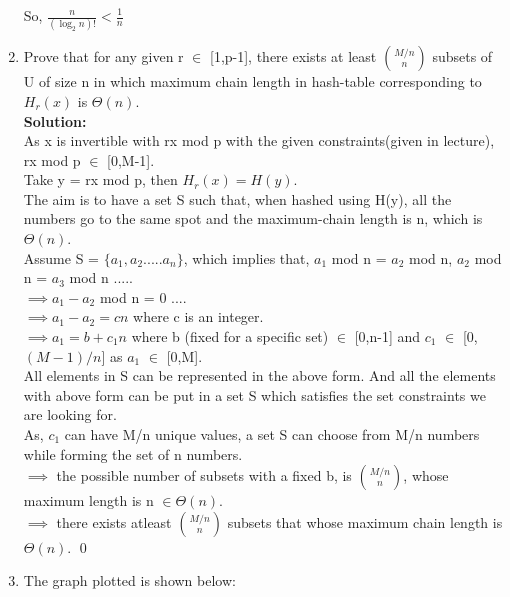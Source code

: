 \documentclass[a4paper]{article}
\begin{document}
\begin{enumerate}[label=(\alph*)]
\begin{center}
    So, $\frac{n}{(\log_2 n)!} < \frac{1}{n}$
\end{center}
\item Prove that for any given r $\in$ [1,p-1], there exists at least $M/n \choose n$ subsets of U of size n in which maximum chain length in hash-table corresponding to $H_r(x)$ is $\Theta(n)$.\\
\textbf{Solution:}\\
As x is invertible with rx mod p with the given constraints(given in lecture), rx mod p $\in$ [0,M-1].\\
Take y = rx mod p, then $H_r(x) = H(y)$. \\
The aim is to have a set S such that, when hashed using H(y), all the numbers go to the same spot and the maximum-chain length is n, which is $\Theta(n)$.\\
Assume S = $\{a_1, a_2..... a_n \}$, which implies that, $a_1$ mod n = $a_2$ mod n, $a_2$ mod n = $a_3$ mod n ..... \\
$\implies a_1-a_2$ mod n = 0 ....\\
$\implies a_1 - a_2 = cn$ where c is an integer.\\
$\implies a_1 = b + c_1n$ where b (fixed for a specific set) $\in$ [0,n-1] and $c_1$ $\in$ [0, $(M-1)/n$] as $a_1$ $\in$ [0,M]. \\ 
All elements in S can be represented in the above form. And all the elements with above form can be put in a set S which satisfies the set constraints we are looking for.\\
As, $c_1$ can have M/n unique values, a set S can choose from M/n numbers while forming the set of n numbers.\\
$\implies$ the possible number of subsets with a fixed b, is {$M/n\choose n$}, whose maximum length is n $\in \Theta(n)$.\\
$\implies$ there exists atleast {$M/n\choose n$} subsets that whose maximum chain length is $\Theta(n)$. {\hfill\qed}

\item The graph plotted is shown below:


\end{enumerate}
\end{document}
